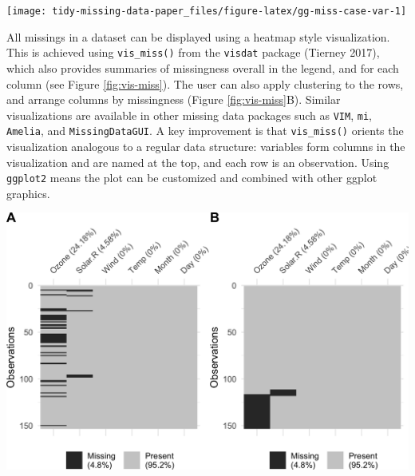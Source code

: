 \documentclass[]{article}
\let\origfigure\figure
\let\endorigfigure\endfigure
\renewenvironment{figure}[1][2] {
    \expandafter\origfigure\expandafter[H]
} {
    \endorigfigure
}
\theoremstyle{definition}
\theoremstyle{definition}
\theoremstyle{definition}
\theoremstyle{remark}
\begin{document}
\begin{figure}

{\centering \texttt{[image: tidy-missing-data-paper\_files/figure-latex/gg-miss-case-var-1]} 

}

\caption{Graphical summaries of missingness in variables and cases for the airquality data. (A) Missings in each variable and (B) in each case. There are missing values in Ozone and Solar.R, with Ozone having more missings, and not many cases have two missing values, with most missingness being from cases with one missing value.}\label{fig:gg-miss-case-var}
\end{figure}

All missings in a dataset can be displayed using a heatmap style
visualization. This is achieved using \texttt{vis\_miss()} from the
\texttt{visdat} package (Tierney 2017), which also provides summaries of
missingness overall in the legend, and for each column (see Figure
\ref{fig:vis-miss}). The user can also apply clustering to the rows, and
arrange columns by missingness (Figure \ref{fig:vis-miss}B). Similar
visualizations are available in other missing data packages such as
\texttt{VIM}, \texttt{mi}, \texttt{Amelia}, and \texttt{MissingDataGUI}.
A key improvement is that \texttt{vis\_miss()} orients the visualization
analogous to a regular data structure: variables form columns in the
visualization and are named at the top, and each row is an observation.
Using \texttt{ggplot2} means the plot can be customized and combined
with other ggplot graphics.

\begin{figure}

{\centering \includegraphics[width=0.95\linewidth]{tidy-missing-data-paper_files/figure-latex/vis-miss-1} 

}

\caption{Heatmap visualizations of missing data for the airquality dataset. (A) The default output and (B) ordered by clustering on rows and columns. There are only missings in ozone and solar radiation, and there appears to be some structure to their missingness.}\label{fig:vis-miss}
\end{figure}
\end{document}
